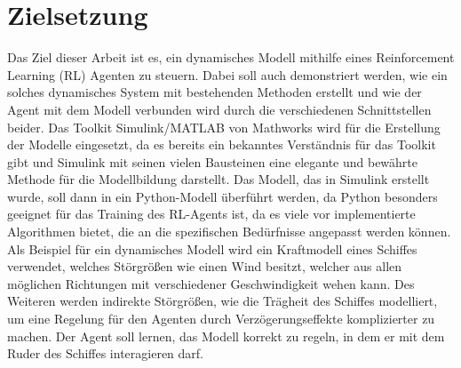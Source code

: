 \documentclass[]{iat}
\begin{document}
\section{Zielsetzung} \label{sec:zielsetzung}
Das Ziel dieser Arbeit ist es, ein dynamisches Modell mithilfe eines Reinforcement Learning (RL) Agenten zu steuern. Dabei soll auch demonstriert werden, wie ein solches dynamisches System mit bestehenden Methoden erstellt und wie der Agent mit dem Modell verbunden wird durch die verschiedenen Schnittstellen beider. Das Toolkit Simulink/MATLAB von Mathworks \cite[]{simulink} wird für die Erstellung der Modelle eingesetzt, da es bereits ein bekanntes Verständnis für das Toolkit gibt und Simulink mit seinen vielen Bausteinen eine elegante und bewährte Methode für die Modellbildung darstellt. Das Modell, das in Simulink erstellt wurde, soll dann in ein Python-Modell überführt werden, da Python \cite[]{python} besonders geeignet für das Training des RL-Agents ist, da es viele vor implementierte Algorithmen bietet, die an die spezifischen Bedürfnisse angepasst werden können. Als Beispiel für ein dynamisches Modell wird ein Kraftmodell eines Schiffes verwendet, welches Störgrößen wie einen Wind besitzt, welcher aus allen möglichen Richtungen mit verschiedener Geschwindigkeit wehen kann. Des Weiteren werden indirekte Störgrößen, wie die Trägheit des Schiffes modelliert, um eine Regelung für den Agenten durch Verzögerungseffekte komplizierter zu machen. Der Agent soll lernen, das Modell korrekt zu regeln, in dem er mit dem Ruder des Schiffes interagieren darf.
\end{document}
